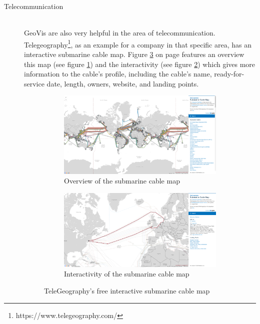 \begin{description}
\item[Telecommunication] \hfill \\
\ac{GeoVis} are also very helpful in the area of telecommunication. Telegeography\footnote{https://www.telegeography.com/}, as an example for a company in that specific area, has an interactive submarine cable map. Figure \ref{fig:both-submarines} on page \pageref{fig:both-submarines} features an overview this map (see figure \ref{fig:submarine}) and the interactivity (see figure \ref{fig:submarine-interactive}) which gives more information to the cable’s profile, including the cable’s name, ready-for-service date, length, owners, website, and landing points.

\begin{figure}[!htb]
  \captionsetup[subfigure]{justification=centering}
  \centering
  \begin{subfigure}[b]{0.4\textwidth}
    \includegraphics[width=\textwidth]{images/geovis/submarine.png}
    \caption[Overview of the submarine cable map]{Overview of the submarine cable map}
    \label{fig:submarine}
  \end{subfigure}
  \hfill
  \begin{subfigure}[b]{0.4\textwidth}
    \includegraphics[width=\textwidth]{images/geovis/submarine-interactive.png}
    \caption[Interactivity of the submarine cable map]{Interactivity of the submarine cable map}
    \label{fig:submarine-interactive}
  \end{subfigure}
    \caption[
        TeleGeography’s free interactive submarine cable map, Urldate: 07.2016 \newline
    \small\texttt{\url{http://www.submarinecablemap.com/}}
    ]{TeleGeography’s free interactive submarine cable map}
  \label{fig:both-submarines}
\end{figure}


\end{description}
